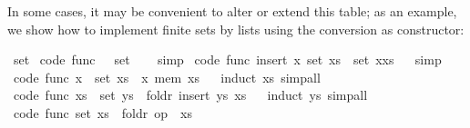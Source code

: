 \begin{isabellebody}
\begin{isamarkuptext}
  In some cases, it may be convenient to alter or
  extend this table;  as an example, we show
  how to implement finite sets by lists
  using the conversion 
  as constructor:%
\end{isamarkuptext}%
\isamarkuptrue%
\isamarkupfalse%
\ set\isanewline
\isanewline
{}\isamarkupfalse%
\ {\isacharbrackleft}code\ func{\isacharbrackright}{\isacharcolon}\ {\isachardoublequoteopen}{\isacharbraceleft}{\isacharbraceright}\ {\isacharequal}\ set\ {\isacharbrackleft}{\isacharbrackright}{\isachardoublequoteclose}%
\isadelimproof
\ %
\endisadelimproof
%
\isatagproof
{}\isamarkupfalse%
\ simp%
\endisatagproof
{\isafoldproof}%
%
\isadelimproof
%
\endisadelimproof
\isanewline
\isanewline
{}\isamarkupfalse%
\ {\isacharbrackleft}code\ func{\isacharbrackright}{\isacharcolon}\ {\isachardoublequoteopen}insert\ x\ {\isacharparenleft}set\ xs{\isacharparenright}\ {\isacharequal}\ set\ {\isacharparenleft}x{\isacharhash}xs{\isacharparenright}{\isachardoublequoteclose}%
\isadelimproof
\ %
\endisadelimproof
%
\isatagproof
{}\isamarkupfalse%
\ simp%
\endisatagproof
{\isafoldproof}%
%
\isadelimproof
%
\endisadelimproof
\isanewline
\isanewline
{}\isamarkupfalse%
\ {\isacharbrackleft}code\ func{\isacharbrackright}{\isacharcolon}\ {\isachardoublequoteopen}x\ {\isasymin}\ set\ xs\ {\isasymlongleftrightarrow}\ x\ mem\ xs{\isachardoublequoteclose}%
\isadelimproof
\ %
\endisadelimproof
%
\isatagproof
{}\isamarkupfalse%
\ {\isacharparenleft}induct\ xs{\isacharparenright}\ simp{\isacharunderscore}all%
\endisatagproof
{\isafoldproof}%
%
\isadelimproof
%
\endisadelimproof
\isanewline
\isanewline
{}\isamarkupfalse%
\ {\isacharbrackleft}code\ func{\isacharbrackright}{\isacharcolon}\ {\isachardoublequoteopen}xs\ {\isasymunion}\ set\ ys\ {\isacharequal}\ foldr\ insert\ ys\ xs{\isachardoublequoteclose}%
\isadelimproof
\ %
\endisadelimproof
%
\isatagproof
{}\isamarkupfalse%
\ {\isacharparenleft}induct\ ys{\isacharparenright}\ simp{\isacharunderscore}all%
\endisatagproof
{\isafoldproof}%
%
\isadelimproof
%
\endisadelimproof
\isanewline
\isanewline
{}\isamarkupfalse%
\ {\isacharbrackleft}code\ func{\isacharbrackright}{\isacharcolon}\ {\isachardoublequoteopen}{\isasymUnion}set\ xs\ {\isacharequal}\ foldr\ {\isacharparenleft}op\ {\isasymunion}{\isacharparenright}\ xs\ {\isacharbraceleft}{\isacharbraceright}{\isachardoublequoteclose}%

\end{isabellebody}

